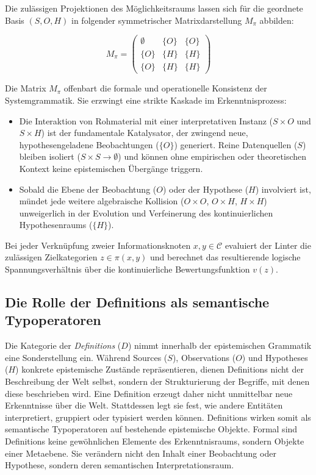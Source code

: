 \documentclass[11pt, a4paper]{article}
\begin{document}
	Die zulässigen Projektionen des Möglichkeitsraums lassen sich für die geordnete Basis $(S, O, H)$ in folgender symmetrischer Matrixdarstellung $M_\pi$ abbilden:
	
	\[
	M_\pi = \begin{pmatrix}
		\emptyset & \{O\} & \{O\} \\
		\{O\} & \{H\} & \{H\} \\
		\{O\} & \{H\} & \{H\}
	\end{pmatrix}
	\]
	
	Die Matrix $M_\pi$ offenbart die formale und operationelle Konsistenz der Systemgrammatik. Sie erzwingt eine strikte Kaskade im Erkenntnisprozess: 
	\begin{itemize}
		\item Die Interaktion von Rohmaterial mit einer interpretativen Instanz ($S \times O$ und $S \times H$) ist der fundamentale Katalysator, der zwingend neue, hypothesengeladene Beobachtungen ($\{O\}$) generiert. Reine Datenquellen ($S$) bleiben isoliert ($S \times S \to \emptyset$) und können ohne empirischen oder theoretischen Kontext keine epistemischen Übergänge triggern.
		\item Sobald die Ebene der Beobachtung ($O$) oder der Hypothese ($H$) involviert ist, mündet jede weitere algebraische Kollision ($O \times O$, $O \times H$, $H \times H$) unweigerlich in der Evolution und Verfeinerung des kontinuierlichen Hypothesenraums ($\{H\}$).
	\end{itemize}
	Bei jeder Verknüpfung zweier Informationsknoten $x, y \in \mathcal{C}$ evaluiert der Linter die zulässigen Zielkategorien $z \in \pi(x, y)$ und berechnet das resultierende logische Spannungsverhältnis über die kontinuierliche Bewertungsfunktion $v(z)$.
	
	\subsection{Die Rolle der Definitions als semantische Typoperatoren}
	
	Die Kategorie der \emph{Definitions} ($D$) nimmt innerhalb der epistemischen Grammatik eine Sonderstellung ein. Während Sources ($S$), Observations ($O$) und Hypotheses ($H$) konkrete epistemische Zustände repräsentieren, dienen Definitions nicht der Beschreibung der Welt selbst, sondern der Strukturierung der Begriffe, mit denen diese beschrieben wird. Eine Definition erzeugt daher nicht unmittelbar neue Erkenntnisse über die Welt. Stattdessen legt sie fest, wie andere Entitäten interpretiert, gruppiert oder typisiert werden können. Definitions wirken somit als semantische Typoperatoren auf bestehende epistemische Objekte. Formal sind Definitions keine gewöhnlichen Elemente des Erkenntnisraums, sondern Objekte einer Metaebene. Sie verändern nicht den Inhalt einer Beobachtung oder Hypothese, sondern deren semantischen Interpretationsraum.
	
\end{document}
